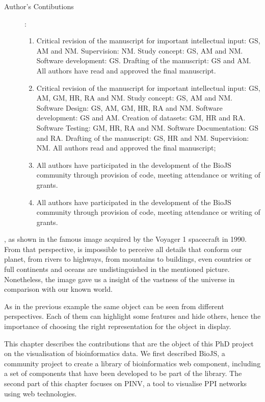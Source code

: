 \begin{description}
	\item[Author's Contibutions]:\\
		\begin{enumerate}
			\item Critical revision of the manuscript for important intellectual input: GS, AM and NM. Supervision: NM. Study concept: GS, AM and NM. Software development: GS. Drafting of the manuscript: GS and AM. All authors have read and approved the final manuscript.
			\item Critical revision of the manuscript for important intellectual input: GS, AM, GM, HR, RA and NM. Study concept: GS, AM and NM. Software Design: GS, AM, GM, HR, RA and NM. Software development: GS and AM. Creation of datasets: GM, HR and RA. Software Testing: GM, HR, RA and NM. Software Documentation: GS and RA. Drafting of the manuscript: GS, HR and NM. Supervision: NM. All authors read and approved the final manuscript;
			\item All authors have participated in the development of the BioJS community through provision of code, meeting attendance or writing of grants.
			\item All authors have participated in the development of the BioJS community through provision of code, meeting attendance or writing of grants.
		\end{enumerate}
\end{description}
\newpage
{}, as shown in the famous image acquired by the Voyager 1 spacecraft in 1990. From that perspective, is impossible to perceive all details that conform our planet, from rivers to highways, from mountains to buildings, even countries or full continents and oceans are undistinguished in the mentioned picture. Nonetheless, the image gave us a insight of the vastness of the universe in comparison with our known world.

As in the previous example the same object can be seen from different perspectives. Each of them can highlight some features and hide others, hence the importance of choosing the right representation for the object in display.

This chapter describes the contributions that are the object of this PhD project on the visualisation of bioinformatics data. We first described BioJS, a community project to create a library of bioinformatics web component, including a set of components that have been developed to be part of the library. The second part of this chapter focuses on PINV, a tool to visualise PPI networks using web technologies.


